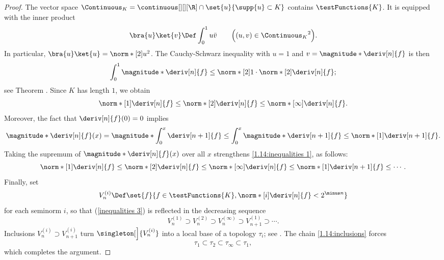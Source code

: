 \begin{proof}%
The vector space $\Continuous_{K}= \continuous[][][\R]\cap \set{u}{\supp{u} \subset K}$ contains $\testFunctions{K}$. It is equipped with the inner %
product 
%
\begin{align}
  \bra{u}\ket{v} \Def \int_0^1 u \bar{v} \qquad \Bigl((u,v) \in {\Continuous_{K}}^2 \Bigr). 
\end{align}
%
In particular, $\bra{u}\ket{u} = \norm*[2]{u}^2$. The Cauchy-Schwarz inequality with $u=1$ and $v= \magnitude*{\deriv[n]{f}}$ is then
%
\begin{equation}
  \int_0^1 \magnitude*{\deriv[n]{f}} \leq \norm*[2]{1} \cdot \norm*[2]{\deriv[n]{f}};
\end{equation}
%
see Theorem . Since $K$ has length $1$, we obtain %
%
\begin{equation}\label{1.14:inequalities 1}
  \norm*[1]{\deriv[n]{f}} \leq \norm*[2]{\deriv[n]{f}} \leq \norm*[\infty]{\deriv[n]{f}}.
\end{equation}
%
Moreover, the fact that $\deriv[n]{f}(0) = 0$ implies
%
\begin{equation}
  \magnitude*{\deriv[n]{f}(x)} = \magnitude*{\int_{0}^x \deriv[n+1]{f}}
  \leq \int_{0}^x \magnitude*{\deriv[n+1]{f}}
  \leq \norm*[1]{\deriv[n+1]{f}}.
\end{equation}
%
Taking the supremum of $\magnitude*{\deriv[n]{f}(x)}$ over all $x$ strengthens \eqref{1.14:inequalities 1}, as follows:
%
\begin{equation}\label{inequalities 3}
  \norm*[1]{\deriv[n]{f}}
  \leq \norm*[2]{\deriv[n]{f}}
  \leq \norm*[\infty]{\deriv[n]{f}}
  \leq \norm*[1]{\deriv[n+1]{f}}
  \leq \cdots .
\end{equation}
%
Finally, set
%
\begin{equation}
  V^{(i)}_n \Def \set{f}{f \in \testFunctions{K}, \norm*[i]{\deriv[n]{f}} < 2^{\minus n}}
\end{equation}
%
for each seminorm $i$, so that (\ref{inequalities 3}) is reflected in the decreasing sequence
%
\begin{equation}\label{1.14:inclusions}
  V^{(1)}_n \supset V^{(2)}_n 
  \supset V^{(\infty)}_n 
  \supset V^{(1)}_{n+1} 
  \supset \cdots .
\end{equation}
%
Inclusions $V^{(i)}_n\supset V^{(i)}_{n+1}$ turn $\singleton[\Big]{V^{(i)}_n}$ into a local base of a topology $\tau_i$; %
see . The chain \eqref{1.14:inclusions} forces %
%
\begin{equation}
  \tau_1 \subset \tau_2 \subset \tau_\infty \subset \tau_1, 
\end{equation}
%
which completes the argument.
\end{proof}
% 